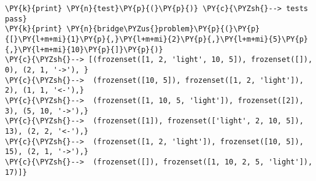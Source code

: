 \begin{Verbatim}[commandchars=\\\{\}]
\PY{k}{print} \PY{n}{test}\PY{p}{(}\PY{p}{)} \PY{c}{\PYZsh{}--> tests pass}
\PY{k}{print} \PY{n}{bridge\PYZus{}problem}\PY{p}{(}\PY{p}{[}\PY{l+m+mi}{1}\PY{p}{,}\PY{l+m+mi}{2}\PY{p}{,}\PY{l+m+mi}{5}\PY{p}{,}\PY{l+m+mi}{10}\PY{p}{]}\PY{p}{)}
\PY{c}{\PYZsh{}--> [(frozenset([1, 2, 'light', 10, 5]), frozenset([]), 0), (2, 1, '->'), }
\PY{c}{\PYZsh{}-->  (frozenset([10, 5]), frozenset([1, 2, 'light']), 2), (1, 1, '<-'),}
\PY{c}{\PYZsh{}-->  (frozenset([1, 10, 5, 'light']), frozenset([2]), 3), (5, 10, '->'),}
\PY{c}{\PYZsh{}-->  (frozenset([1]), frozenset(['light', 2, 10, 5]), 13), (2, 2, '<-'),}
\PY{c}{\PYZsh{}-->  (frozenset([1, 2, 'light']), frozenset([10, 5]), 15), (2, 1, '->'),}
\PY{c}{\PYZsh{}-->  (frozenset([]), frozenset([1, 10, 2, 5, 'light']), 17)]}
\end{Verbatim}
